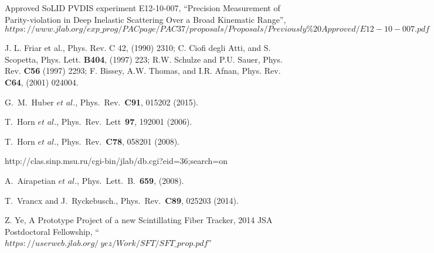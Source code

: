 \begin{thebibliography}{}
  Approved SoLID PVDIS experiment E12-10-007,
  ``Precision Measurement of Parity-violation in Deep Inelastic Scattering Over
  a Broad Kinematic Range'',
  $https://www.jlab.org/exp\_prog/PACpage/PAC37/proposals/Proposals/Previously\%20Approved/E12-10-007.pdf$

J. L. Friar et al., Phys. Rev. C 42, (1990) 2310; C. Ciofi
degli Atti, and S. Scopetta, Phys. Lett. {\bf B404}, (1997) 223; R.W. Schulze
and P.U. Sauer, Phys. Rev. {\bf C56} (1997) 2293; F. Bissey, A.W. Thomas, and
I.R. Afnan, Phys. Rev. {\bf C64}, (2001) 024004.

 G.~M.~Huber $\textit{et}$ $\textit{al}$.,
Phys.~Rev.~\textbf{C91}, 015202 (2015).

 T.~Horn $\textit{et}$ $\textit{al}$.,
Phys.~Rev.~Lett~\textbf{97}, 192001 (2006).

 T.~Horn $\textit{et}$ $\textit{al}$.,
Phys.~Rev.~\textbf{C78}, 058201 (2008).

 http://clas.sinp.msu.ru/cgi-bin/jlab/db.cgi?eid=36;search=on

 A.~Airapetian $\textit{et}$ $\textit{al}$.,
Phys.~Lett.~B.~\textbf{659}, (2008).

 T.~Vrancx and J.~Ryckebusch., Phys.~Rev.~\textbf{C89}, 025203
(2014).

 Z. Ye, A Prototype Project of a new Scintillating Fiber
Tracker, 2014 JSA Postdoctoral Fellowship,
``$https://userweb.jlab.org/~yez/Work/SFT/SFT\_prop.pdf$''

\end{thebibliography}

